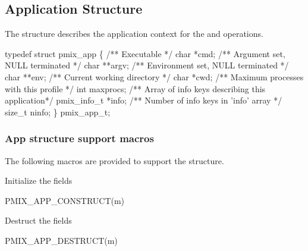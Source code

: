 \subsection{Application Structure}

The  structure describes the application context for the  and  operations.

\cspecificstart
\begin{codepar}
typedef struct pmix_app \{
    /** Executable */
    char *cmd;
    /** Argument set, NULL terminated */
    char **argv;
    /** Environment set, NULL terminated */
    char **env;
    /** Current working directory */
    char *cwd;
    /** Maximum processes with this profile */
    int maxprocs;
    /** Array of info keys describing this application*/
    pmix_info_t *info;
    /** Number of info keys in 'info' array */
    size_t ninfo;
\} pmix_app_t;
\end{codepar}
\cspecificend

\subsubsection{App structure support macros}
The following macros are provided to support the  structure.


Initialize the  fields

\cspecificstart
\begin{codepar}
PMIX_APP_CONSTRUCT(m)
\end{codepar}
\cspecificend

\begin{arglist}
\end{arglist}


Destruct the  fields

\cspecificstart
\begin{codepar}
PMIX_APP_DESTRUCT(m)
\end{codepar}
\cspecificend

